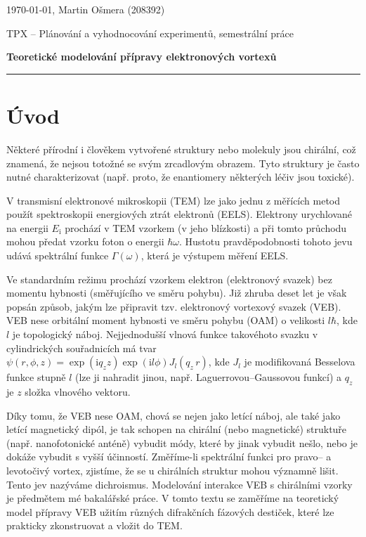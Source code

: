 \documentclass[a4paper,11pt]{article}
\newcommand{\iu}{\mathrm{i}}
\newcommand{\init}{\mathrm{i}}
\begin{document}
	
\begin{center}
	
	\today, Martin Ošmera (208392)
	\vspace{2mm}
	
	{\Large TPX -- Plánování a vyhodnocování experimentů, semestrální práce
	
	\vspace{3mm}
	
	\textbf{Teoretické modelování přípravy elektronových vortexů }}
	
	
	
\end{center}
	\hrule

\section*{\centering Úvod}

Některé přírodní i člověkem vytvořené struktury nebo molekuly jsou chirální, což znamená, že nejsou totožné se svým zrcadlovým obrazem. Tyto struktury je často nutné charakterizovat (např. proto, že enantiomery některých léčiv jsou toxické). 

V transmisní elektronové mikroskopii (TEM) lze jako jednu z měřících metod použít spektroskopii energiových ztrát elektronů (EELS). Elektrony urychlované na energii $E_\init$ prochází v TEM vzorkem (v jeho blízkosti) a při tomto průchodu mohou předat vzorku foton o energii $\hbar \omega$. Hustotu pravděpodobnosti tohoto jevu udává spektrální funkce $\Gamma (\omega)$, která je výstupem měření EELS.

Ve standardním režimu prochází vzorkem elektron (elektronový svazek) bez momentu hybnosti (směřujícího ve směru pohybu). Již zhruba deset let je však popsán způsob, jakým lze připravit tzv. elektronový vortexový svazek (VEB). VEB nese orbitální moment hybnosti ve směru pohybu (OAM) o velikosti $l\hbar$, kde $l$ je topologický náboj. Nejjednodušší vlnová funkce takovéhoto svazku v cylindrických souřadnicích má tvar $\psi(r, \phi, z) = \exp( \iu q_z z) \exp( \iu l \phi ) J_l(q_z\,r)$, kde $J_l$ je modifikovaná Besselova funkce stupně $l$ (lze ji nahradit jinou, např. Laguerrovou--Gaussovou funkcí) a $q_z$ je $z$ složka vlnového vektoru.

Díky tomu, že VEB nese OAM, chová se nejen jako letící náboj, ale také jako letící magnetický dipól, je tak schopen na chirální (nebo magnetické) struktuře (např. nanofotonické anténě) vybudit  módy, které by jinak vybudit nešlo, nebo je dokáže vybudit s vyšší účinností. Změříme-li spektrální funkci pro pravo-- a levotočivý vortex, zjistíme, že se u chirálních struktur mohou významně lišit. Tento jev nazýváme dichroismus. Modelování interakce VEB s chirálními vzorky je předmětem mé bakalářské práce. V tomto textu se zaměříme na teoretický model přípravy VEB užitím různých difrakčních fázových destiček, které lze prakticky zkonstruovat a vložit do TEM.
\end{document}
